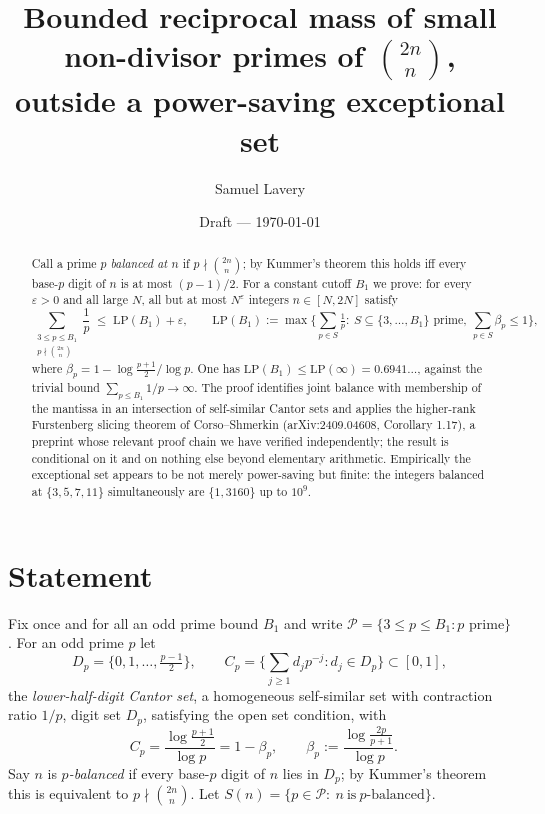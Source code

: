 \documentclass[11pt]{article}
\title{Bounded reciprocal mass of small non-divisor primes of $\binom{2n}{n}$,\\
outside a power-saving exceptional set}
\author{Samuel Lavery}
\date{Draft --- \today}
\DeclareMathOperator{\dimH}{dim_H}
\begin{document}
\maketitle

\begin{abstract}
Call a prime $p$ \emph{balanced at $n$} if $p\nmid\binom{2n}{n}$; by Kummer's theorem
this holds iff every base-$p$ digit of $n$ is at most $(p-1)/2$.  For a constant
cutoff $B_1$ we prove: for every $\varepsilon>0$ and all large $N$, all but at most
$N^{\varepsilon}$ integers $n\in[N,2N]$ satisfy
\[
\sum_{\substack{3\le p\le B_1\\ p\nmid\binom{2n}{n}}}\frac1p\;\le\;
\mathrm{LP}(B_1)+\varepsilon,
\qquad
\mathrm{LP}(B_1):=\max\Big\{\sum_{p\in S}\tfrac1p:\ S\subseteq\{3,\dots,B_1\}
\text{ prime},\ \sum_{p\in S}\beta_p\le1\Big\},
\]
where $\beta_p=1-\log\frac{p+1}{2}/\log p$.  One has $\mathrm{LP}(B_1)\le
\mathrm{LP}(\infty)=0.6941\ldots$, against the trivial bound $\sum_{p\le B_1}1/p\to\infty$.
The proof identifies joint balance with membership of the mantissa in an intersection of
self-similar Cantor sets and applies the higher-rank Furstenberg slicing theorem of
Corso--Shmerkin (arXiv:2409.04608, Corollary 1.17), a preprint whose relevant proof chain
we have verified independently; the result is conditional on it and on nothing else
beyond elementary arithmetic.  Empirically the exceptional set appears to be not merely
power-saving but finite: the integers balanced at $\{3,5,7,11\}$ simultaneously are
$\{1,3160\}$ up to $10^{9}$.
\end{abstract}

\section{Statement}

Fix once and for all an odd prime bound $B_1$ and write $\mathcal P=\{3\le p\le B_1:
p\text{ prime}\}$.  For an odd prime $p$ let
\[
D_p=\{0,1,\dots,\tfrac{p-1}2\},\qquad
C_p=\Big\{\sum_{j\ge1}d_jp^{-j}:d_j\in D_p\Big\}\subset[0,1],
\]
the \emph{lower-half-digit Cantor set}, a homogeneous self-similar set with contraction
ratio $1/p$, digit set $D_p$, satisfying the open set condition, with
\[
\dimH C_p=\frac{\log\frac{p+1}2}{\log p}=1-\beta_p,\qquad
\beta_p:=\frac{\log\frac{2p}{p+1}}{\log p}.
\]
Say $n$ is \emph{$p$-balanced} if every base-$p$ digit of $n$ lies in $D_p$; by Kummer's
theorem this is equivalent to $p\nmid\binom{2n}{n}$.  Let $S(n)=\{p\in\mathcal P:\ n\ \text{is}\
p\text{-balanced}\}$.
\end{document}

